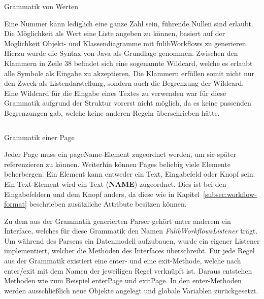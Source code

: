 \begin{listing}[!ht]
    \inputminted[firstnumber=36]{antlr-java}{listings/3.1.3/Values.g4}
    \caption{Grammatik von Werten}
    \label{listing:values}
\end{listing}

Eine Nummer kann lediglich eine ganze Zahl sein, führende Nullen sind erlaubt.
Die Möglichkeit als Wert eine Liste angeben zu können, basiert auf der Möglichkeit Objekt- und Klassendiagramme mit fulibWorkflows zu generieren.
Hierzu wurde die Syntax von Java als Grundlage genommen.
Zwischen den Klammern in Zeile 38 befindet sich eine sogenannte Wildcard, welche es erlaubt alle Symbole als Eingabe zu akzeptieren.
Die Klammern erfüllen somit nicht nur den Zweck als Listendarstellung, sondern auch die Begrenzung der Wildcard.
Eine Wildcard für die Eingabe eines Textes zu verwenden war für diese Grammatik aufgrund der Struktur vorerst nicht möglich, da es keine passenden Begrenzungen gab,
welche keine anderen Regeln überschrieben hätte.

\begin{listing}[!ht]
    \inputminted[firstnumber=23]{antlr-java}{listings/3.1.3/Page.g4}
    \caption{Grammatik einer Page}
    \label{listing:page}
\end{listing}

Jeder Page muss ein pageName-Element zugeordnet werden, um sie später referenzieren zu können.
Weiterhin können Pages beliebig viele Elemente beherbergen.
Ein Element kann entweder ein Text, Eingabefeld oder Knopf sein.
Ein Text-Element wird ein Text (\textbf{NAME}) zugeordnet.
Dies ist bei den Eingabefeldern und dem Knopf anders, da diese wie in Kapitel~\ref{subsec:workflow-format} beschrieben zusätzliche
Attribute besitzen können.

Zu dem aus der Grammatik generierten Parser gehört unter anderem ein Interface, welches für diese Grammatik den Namen \textit{FulibWorkflowsListener} trägt.
Um während des Parsens ein Datenmodell aufzubauen, wurde ein eigener Listener implementiert, welcher die Methoden des Interfaces überschreibt.
Für jede Regel aus der Grammatik existiert eine enter- und eine exit-Methode, welche nach enter/exit mit dem Namen der jeweiligen Regel verknüpft ist.
Daraus entstehen Methoden wie zum Beispiel enterPage und exitPage.
In den enter-Methoden werden ausschließlich neue Objekte angelegt und globale Variablen zurückgesetzt.

